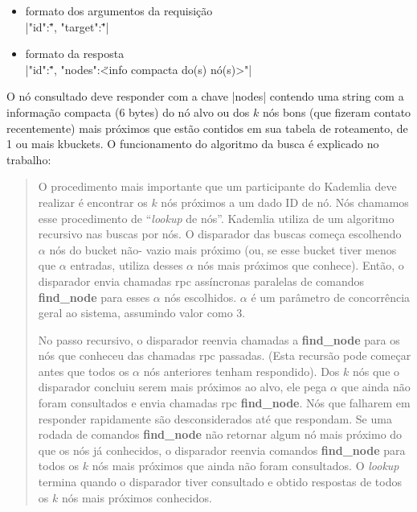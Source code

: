 \begin{itemize}
    \item formato dos argumentos da requisição \\
        \sverb|{"id":\"<IDs dos nós consultantes>", "target":\"<ID do nó alvo>"}|

    \item formato da resposta \\
        \sverb|{"id":\"<IDs dos nós consultados>", "nodes":\"<info compacta do(s) nó(s)>"}|
\end{itemize}

O nó consultado deve responder com a chave \bverb|nodes| contendo uma
\gls*{string} com a informação compacta (6 bytes) do nó alvo ou dos $k$ nós bons (que
fizeram contato recentemente) mais próximos que estão contidos em sua tabela de
roteamento, de 1 ou mais \glspl*{kbucket}. O funcionamento do algoritmo da busca é
explicado no trabalho:

\blockquote{O procedimento mais importante que um participante do Kademlia deve realizar
é encontrar os $k$ nós próximos a um dado ID de nó. Nós chamamos esse procedimento de
\enquote{\emph{lookup} de nós}. Kademlia utiliza de um algoritmo recursivo nas buscas
por nós. O disparador das buscas começa escolhendo $\alpha$ nós do \gls*{bucket} não-
vazio mais próximo (ou, se esse \gls*{bucket} tiver menos que $\alpha$ entradas,
utiliza desses $\alpha$ nós mais próximos que conhece). Então, o disparador envia
chamadas \gls*{rpc} assíncronas paralelas de comandos \textbf{find\_node} para esses
$\alpha$ nós escolhidos. $\alpha$ é um parâmetro de concorrência geral ao sistema,
assumindo valor como 3.

No passo recursivo, o disparador reenvia chamadas a \textbf{find\_node} para os nós que
conheceu das chamadas \gls*{rpc} passadas. (Esta recursão pode começar antes que todos
os $\alpha$ nós anteriores tenham respondido). Dos $k$ nós que o disparador concluiu
serem mais próximos ao alvo, ele pega $\alpha$ que ainda não foram consultados e envia
chamadas \gls*{rpc} \textbf{find\_node}. Nós que falharem em responder rapidamente são
desconsiderados até que respondam. Se uma rodada de comandos \textbf{find\_node} não
retornar algum nó mais próximo do que os nós já conhecidos, o disparador reenvia
comandos \textbf{find\_node} para todos os $k$ nós mais próximos que ainda não foram
consultados. O \emph{lookup} termina quando o disparador tiver consultado e obtido
respostas de todos os $k$ nós mais próximos conhecidos.}

